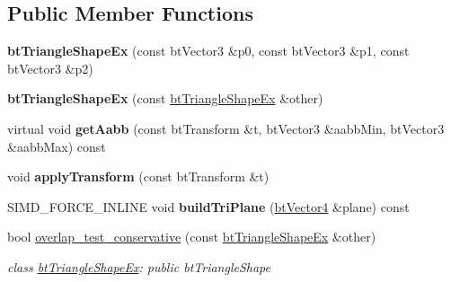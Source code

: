 \subsection*{Public Member Functions}
\begin{DoxyCompactItemize}
\item 
\mbox{\label{classbtTriangleShapeEx_a7809d8da52c8228d662994dc169f82b0}} 
{\bfseries bt\+Triangle\+Shape\+Ex} (const bt\+Vector3 \&p0, const bt\+Vector3 \&p1, const bt\+Vector3 \&p2)
\item 
\mbox{\label{classbtTriangleShapeEx_ab138dd8e1b438d7fd94a1b1ec91ae439}} 
{\bfseries bt\+Triangle\+Shape\+Ex} (const \hyperlink{classbtTriangleShapeEx}{bt\+Triangle\+Shape\+Ex} \&other)
\item 
\mbox{\label{classbtTriangleShapeEx_a90a9a3a12e7870debb747b63c5335249}} 
virtual void {\bfseries get\+Aabb} (const bt\+Transform \&t, bt\+Vector3 \&aabb\+Min, bt\+Vector3 \&aabb\+Max) const
\item 
\mbox{\label{classbtTriangleShapeEx_a7d4d509262b012617f76b05d531a64a7}} 
void {\bfseries apply\+Transform} (const bt\+Transform \&t)
\item 
\mbox{\label{classbtTriangleShapeEx_a49ee86b4942340a3b3141a7044337113}} 
S\+I\+M\+D\+\_\+\+F\+O\+R\+C\+E\+\_\+\+I\+N\+L\+I\+NE void {\bfseries build\+Tri\+Plane} (\hyperlink{classbtVector4}{bt\+Vector4} \&plane) const
\item 
\mbox{\label{classbtTriangleShapeEx_a8642843da440361eecf27d5a074d6231}} 
bool \hyperlink{classbtTriangleShapeEx_a8642843da440361eecf27d5a074d6231}{overlap\+\_\+test\+\_\+conservative} (const \hyperlink{classbtTriangleShapeEx}{bt\+Triangle\+Shape\+Ex} \&other)
\begin{DoxyCompactList}\small\item\em class \hyperlink{classbtTriangleShapeEx}{bt\+Triangle\+Shape\+Ex}\+: public bt\+Triangle\+Shape \end{DoxyCompactList}\item 
\mbox{\label{classbtTriangleShapeEx_a7809d8da52c8228d662994dc169f82b0}} 

\end{DoxyCompactItemize}

